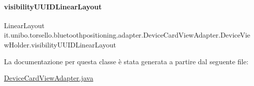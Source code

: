 \paragraph{\texorpdfstring{visibility\+U\+U\+I\+D\+Linear\+Layout}{visibilityUUIDLinearLayout}}
{\footnotesize\ttfamily Linear\+Layout it.\+unibo.\+torsello.\+bluetoothpositioning.\+adapter.\+Device\+Card\+View\+Adapter.\+Device\+View\+Holder.\+visibility\+U\+U\+I\+D\+Linear\+Layout\hspace{0.3cm}{\ttfamily [package]}}



La documentazione per questa classe è stata generata a partire dal seguente file\+:\begin{DoxyCompactItemize}
\item 
\hyperlink{DeviceCardViewAdapter_8java}{Device\+Card\+View\+Adapter.\+java}\end{DoxyCompactItemize}
